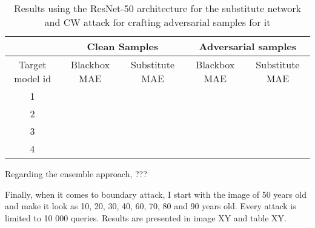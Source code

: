 \begin{table}[]
\begin{tabular}{|c|c|c|c|c|}
\hline
 & \multicolumn{2}{c|}{Clean Samples} & \multicolumn{2}{c|}{Adversarial samples} \\ \hline
Target model id & Blackbox MAE & Substitute MAE & Blackbox MAE & Substitute MAE \\ \hline
1 &  & &  &  \\ \hline
2 &  &  &  &  \\ \hline
3 &  &  &  &  \\ \hline
4 &  &  &  &  \\ \hline
\end{tabular}
\caption{Results using the ResNet-50 architecture for the substitute network and CW attack for crafting adversarial samples for it}
\label{table:bbox-cw-resnet}
\end{table}

%

Regarding the ensemble approach, ???

Finally, when it comes to boundary attack, I start with the image of 50 years old and make it look as 10, 20, 30, 40, 60, 70, 80 and 90 years old. Every attack is limited to 10 000 queries. Results are presented in image XY and table XY.


